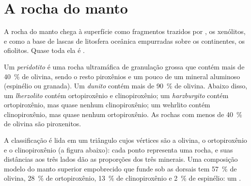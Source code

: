 \section{A rocha do manto}\label{sec:b2:mantle-melting:rock}

A rocha do manto chega à superfície como fragmentos trazidos por , os
xenólitos, e como a base de lascas de litosfera oceânica empurradas sobre os
continentes, os ofiolitos. Quase toda ela é .

\begin{definition}\label{def:b2:mantle-melting:peridotites}
Um \emph{peridotito} é uma rocha ultramáfica de granulação grossa
que contém mais de \qty{40}{\percent} de olivina, sendo o resto piroxênios e um
pouco de um mineral aluminoso (espinélio ou granada). Um
\emph{dunito} contém mais de \qty{90}{\percent} de olivina. Abaixo
disso, um \emph{lherzolito} contém ortopiroxênio e
clinopiroxênio; um \emph{harzburgito} contém ortopiroxênio, mas
quase nenhum clinopiroxênio; um wehrlito contém clinopiroxênio, mas quase nenhum
ortopiroxênio. As rochas com menos de \qty{40}{\percent} de olivina são piroxenitos.
\end{definition}

A classificação é lida em um triângulo cujos vértices são a olivina, o
ortopiroxênio e o clinopiroxênio (a figura abaixo): cada ponto representa uma rocha,
e suas distâncias aos três lados dão as proporções dos três
minerais. Uma composição modelo do manto superior empobrecido que funde sob
as dorsais tem \qty{57}{\percent} de olivina,
\qty{28}{\percent} de ortopiroxênio, \qty{13}{\percent} de clinopiroxênio e
\qty{2}{\percent} de espinélio: um .

